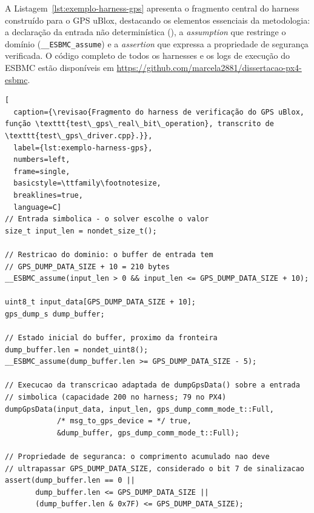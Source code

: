 A Listagem~\ref{lst:exemplo-harness-gps} apresenta o fragmento central do harness construído para o GPS uBlox, destacando os elementos essenciais da metodologia: a declaração da entrada não determinística (), a \textit{assumption} que restringe o domínio (\texttt{\_\_ESBMC\_assume}) e a \textit{assertion} que expressa a propriedade de segurança verificada. O código completo de todos os harnesses e os logs de execução do ESBMC estão disponíveis em \url{https://github.com/marcela2881/dissertacao-px4-esbmc}.

\begin{lstlisting}[
  caption={\revisao{Fragmento do harness de verificação do GPS uBlox, função \texttt{test\_gps\_real\_bit\_operation}, transcrito de \texttt{test\_gps\_driver.cpp}.}},
  label={lst:exemplo-harness-gps},
  numbers=left,
  frame=single,
  basicstyle=\ttfamily\footnotesize,
  breaklines=true,
  language=C]
// Entrada simbolica - o solver escolhe o valor
size_t input_len = nondet_size_t();

// Restricao do dominio: o buffer de entrada tem
// GPS_DUMP_DATA_SIZE + 10 = 210 bytes
__ESBMC_assume(input_len > 0 && input_len <= GPS_DUMP_DATA_SIZE + 10);

uint8_t input_data[GPS_DUMP_DATA_SIZE + 10];
gps_dump_s dump_buffer;

// Estado inicial do buffer, proximo da fronteira
dump_buffer.len = nondet_uint8();
__ESBMC_assume(dump_buffer.len >= GPS_DUMP_DATA_SIZE - 5);

// Execucao da transcricao adaptada de dumpGpsData() sobre a entrada
// simbolica (capacidade 200 no harness; 79 no PX4)
dumpGpsData(input_data, input_len, gps_dump_comm_mode_t::Full,
            /* msg_to_gps_device = */ true,
            &dump_buffer, gps_dump_comm_mode_t::Full);

// Propriedade de seguranca: o comprimento acumulado nao deve
// ultrapassar GPS_DUMP_DATA_SIZE, considerado o bit 7 de sinalizacao
assert(dump_buffer.len == 0 ||
       dump_buffer.len <= GPS_DUMP_DATA_SIZE ||
       (dump_buffer.len & 0x7F) <= GPS_DUMP_DATA_SIZE);
\end{lstlisting}


